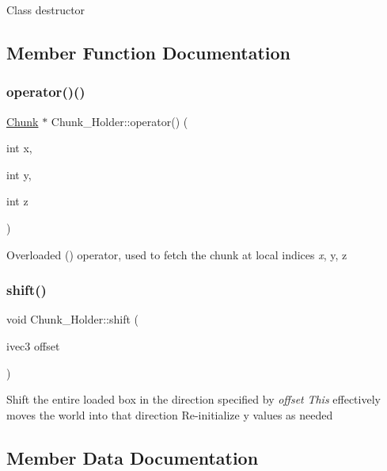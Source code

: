 Class destructor 

\subsection{Member Function Documentation}
\mbox{\label{classChunk__Holder_aea3fa247a63abc4ff78af82f901840df}} 
\subsubsection{\texorpdfstring{operator()()}{operator()()}}
{\footnotesize\ttfamily \mbox{\hyperlink{classChunk}{Chunk}} $\ast$ Chunk\+\_\+\+Holder\+::operator() (\begin{DoxyParamCaption}\item[{int}]{x,  }\item[{int}]{y,  }\item[{int}]{z }\end{DoxyParamCaption})}

Overloaded () operator, used to fetch the chunk at local indices {\itshape x}, y, z {\itshape } \mbox{\label{classChunk__Holder_a383070a12c061c7a1a989af13adcef56}} 
\subsubsection{\texorpdfstring{shift()}{shift()}}
{\footnotesize\ttfamily void Chunk\+\_\+\+Holder\+::shift (\begin{DoxyParamCaption}\item[{ivec3}]{offset }\end{DoxyParamCaption})}

Shift the entire loaded box in the direction specified by {\itshape offset} {\itshape This} effectively moves the world into that direction Re-\/initialize y values as needed 

\subsection{Member Data Documentation}
\mbox{\label{classChunk__Holder_a50d70dce3408437c449b72ab85bfa435}} 
